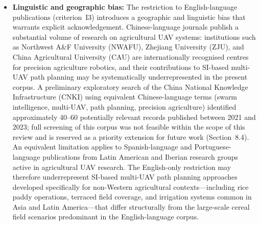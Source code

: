 \documentclass[review,3p,times]{elsarticle}
\begin{document}
\begin{itemize}
  \item \textbf{Linguistic and geographic bias:} The restriction to English-language publications (criterion~I3) introduces a geographic and linguistic bias that warrants explicit acknowledgement. Chinese-language journals publish a substantial volume of research on agricultural UAV systems: institutions such as Northwest A\&F University (NWAFU), Zhejiang University (ZJU), and China Agricultural University (CAU) are internationally recognised centres for precision agriculture robotics, and their contributions to SI-based multi-UAV path planning may be systematically underrepresented in the present corpus. A preliminary exploratory search of the China National Knowledge Infrastructure (CNKI) using equivalent Chinese-language terms (swarm intelligence, multi-UAV, path planning, precision agriculture) identified approximately 40--60 potentially relevant records published between 2021 and 2023; full screening of this corpus was not feasible within the scope of this review and is reserved as a priority extension for future work (Section~8.4). An equivalent limitation applies to Spanish-language and Portuguese-language publications from Latin American and Iberian research groups active in agricultural UAV research. The English-only restriction may therefore underrepresent SI-based multi-UAV path planning approaches developed specifically for non-Western agricultural contexts---including rice paddy operations, terraced field coverage, and irrigation systems common in Asia and Latin America---that differ structurally from the large-scale cereal field scenarios predominant in the English-language corpus.

\end{itemize}
\end{document}
